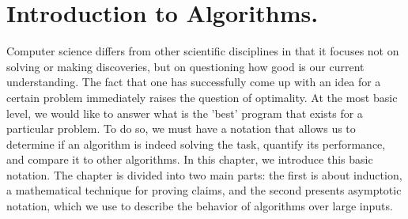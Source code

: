 



\newcommand*{\RECITATION}{}%
\newcommand*{\BOOK}{}%


\section{Introduction to Algorithms.}
\ifdefined\RECITATION
\else
Computer science differs from other scientific disciplines in that it focuses not on solving or making discoveries, but on questioning how good is our current understanding. The fact that one has successfully come up with an idea for a certain problem immediately raises the question of optimality. At the most basic level, we would like to answer what is the 'best'  program that exists for a particular problem. To do so, we must have a notation that allows us to determine if an algorithm is indeed solving the task, quantify its performance, and compare it to other algorithms. In this chapter, we introduce this basic notation. The chapter is divided into two main parts: the first is about induction, a mathematical technique for proving claims, and the second presents asymptotic notation, which we use to describe the behavior of algorithms over large inputs.
\fi
